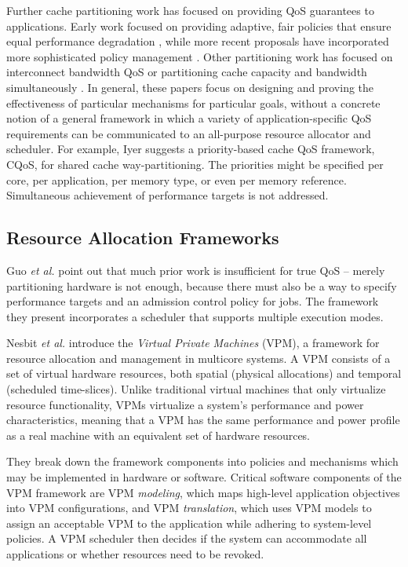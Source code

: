 Further cache partitioning work has focused on providing QoS guarantees to applications. Early work focused on providing adaptive, fair policies that ensure equal performance degradation \cite{605420,1086328}, while more recent proposals have incorporated more sophisticated policy management \cite{1241608,1331730,1152161,1254886}. Other partitioning work has focused on interconnect bandwidth QoS \cite{1382130} or partitioning cache capacity and bandwidth simultaneously \cite{1250671}. In general, these papers focus on designing and proving the effectiveness of particular mechanisms for particular goals, without a concrete notion of a general framework in which a variety of application-specific QoS requirements can be communicated to an all-purpose resource allocator and scheduler.
%
For example, Iyer\cite{1006246} suggests a priority-based cache QoS framework, CQoS, for shared cache way-partitioning.
The priorities might be specified per core, per application, per memory type, or even per memory reference.
Simultaneous achievement of performance targets is not addressed.

\subsection*{Resource Allocation Frameworks}

Guo \emph{et al.}\cite{1331730} point out that much prior work is insufficient for true QoS -- merely partitioning hardware is not enough, because there must also be a way to specify performance targets and an admission control policy for jobs.
The framework they present incorporates a scheduler that supports multiple execution modes.

Nesbit \emph{et al.}\cite{1436097} introduce the \emph{Virtual Private Machines} (VPM), a framework for resource allocation and management in multicore systems. A VPM consists of a set of virtual hardware resources, both spatial (physical allocations) and temporal (scheduled time-slices).  Unlike traditional virtual machines that only virtualize resource functionality, VPMs virtualize a system's performance and power characteristics, meaning that a VPM has the same performance and power profile as a real machine with an equivalent set of hardware resources.

They break down the framework components into policies and mechanisms which may be implemented in hardware or software. Critical software components of the VPM framework are VPM {\em modeling}, which maps high-level application objectives into VPM configurations, and VPM {\em translation}, which uses VPM models to assign an acceptable VPM to the application while adhering to system-level policies. A VPM scheduler then decides if the system can accommodate all applications or whether resources need to be revoked.

